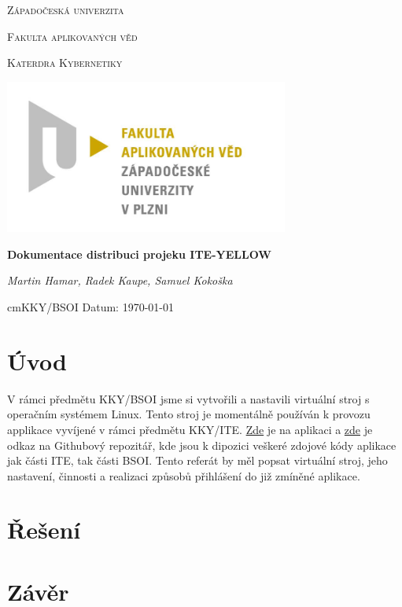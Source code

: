 \documentclass{article}
\begin{document}
\begin{titlepage}

    \centering

    {\scshape\LARGE Západočeská univerzita\par}
    {\scshape\Large Fakulta aplikovaných věd \par}
    {\scshape\Large Katerdra Kybernetiky \par}
    {\begin{center}
            \includegraphics[width=0.7\textwidth]{../pic/fav.jpg}
        \end{center}}

    {\huge\bfseries Dokumentace distribuci projeku ITE-YELLOW\par} %

    \vspace{2cm}

    {\Large\itshape Martin Hamar, Radek Kaupe, Samuel Kokoška\par}

    \vfill

    \vspace{1cm}

     cm{KKY/BSOI} \hfill {Datum: \today }



\end{titlepage}

\section{Úvod}
V rámci předmětu KKY/BSOI jsme si vytvořili a nastavili virtuální stroj s operačním systémem Linux. 
Tento stroj je momentálně používán k provozu applikace vyvíjené v rámci předmětu KKY/ITE. \href{http://147.228.173.162:8881}{Zde} je na aplikaci a \href{https://github.com/RadekKaupe/ITE-Yellow-2024}{zde} je odkaz na Githubový repozitář, kde jsou k dipozici veškeré zdojové kódy aplikace jak části ITE, tak části BSOI. 
Tento referát by měl popsat virtuální stroj, jeho nastavení, činnosti a realizaci způsobů přihlášení do již zmíněné aplikace.   
\section{Řešení}









\section{Závěr}
\end{document}
